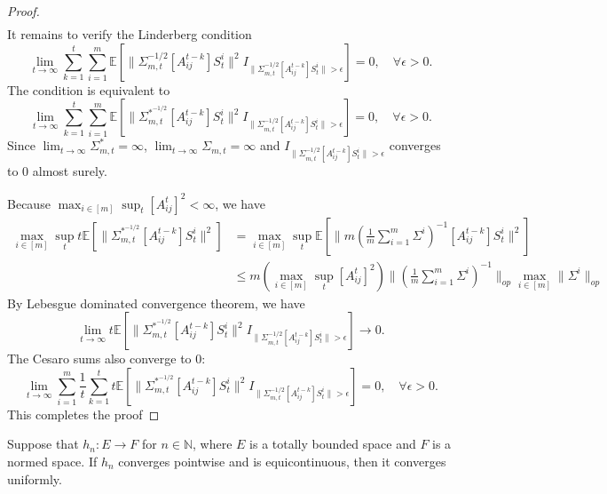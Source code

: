 \documentclass[twoside,11pt]{article}
\numberwithin{equation}{section}
\newcommand{\N}{{\mathbb{N}}}
\newcommand{\E}{\mathbb{E}}
\begin{document}
{\begin{proof}
\begin{align*}
    \end{align*}
It remains to verify the Linderberg condition
\begin{equation*}
    \lim_{t \to \infty}  \sum_{k = 1}^t \sum_{i = 1}^m \E\left[\|\Sigma_{m,t}^{-1/2} [A_{ij}^{t-k}] S_t^i \|^2 I_{\|\Sigma_{m,t}^{-1/2} [A_{ij}^{t-k}] S_t^i\| > \epsilon}\right]  = 0, \quad \forall \epsilon > 0. 
\end{equation*}
The condition is equivalent to 
\begin{equation*}
            \lim_{t \to \infty}  \sum_{k = 1}^t \sum_{i = 1}^m \E\left[\|\Sigma_{m,t}^{*^{-1/2}} [A_{ij}^{t-k}] S_t^i\|^2 I_{\|\Sigma_{m,t}^{-1/2} [A_{ij}^{t-k}] S_t^i\| > \epsilon}\right]  = 0, \quad \forall \epsilon > 0. 
\end{equation*}    
Since $\lim_{t \to \infty}\Sigma^*_{m,t} =  \infty$, $\lim_{t \to \infty}\Sigma_{m,t} = \infty$ and $ I_{\|\Sigma_{m,t}^{-1/2} [A_{ij}^{t-k}] S_t^i\| > \epsilon}$ converges to $0$ almost surely. 

Because $\max_{i \in [m]} \sup_t [A_{ij}^t]^2 < \infty$, we have
\begin{align*}
    \max_{i \in [m]}\sup_{t} t\E\left[ \|\Sigma_{m,t}^{*^{-1/2}} [A_{ij}^{t-k}] S_t^i\|^2\right] &= \max_{i \in [m]} \sup_{t} \E\left[\|m(\frac{1}{m}\sum_{i = 1}^m  \Sigma^i)^{-1} [A_{ij}^{t-k}] S_t^i\|^2\right]  \\
    &\leq m (\max_{i \in [m]} \sup_t [A_{ij}^t]^2 ) \|(\frac{1}{m}\sum_{i = 1}^m  \Sigma^i)^{-1}\|_{op} \max_{i \in [m]} \|\Sigma^i \|_{op}
\end{align*}
By Lebesgue dominated convergence theorem, we have
\begin{equation*}
    \lim_{t \to \infty} t\E\left[\|\Sigma_{m,t}^{*^{-1/2}} [A_{ij}^{t-k}] S_t^i\|^2 I_{\|\Sigma_{m,t}^{-1/2} [A_{ij}^{t-k}] S_t^i\| > \epsilon}\right]  \to 0. 
\end{equation*}
The Cesaro sums also converge to $0$: 
\begin{equation*}
    \lim_{t \to \infty} \sum_{i = 1}^m \frac{1}{t}\sum_{k = 1}^t t \E\left[\|\Sigma_{m,t}^{*^{-1/2}} [A_{ij}^{t-k}] S_t^i\|^2 I_{\|\Sigma_{m,t}^{-1/2} [A_{ij}^{t-k}] S_t^i\| > \epsilon}\right]  = 0, \quad \forall \epsilon > 0. 
\end{equation*}
This completes the proof
\end{proof}

\begin{lemma} 
\label{uniform-convergence-lemma}
Suppose that $h_n: E \to F$ for $n \in \N$, where $E$ is a totally bounded space and $F$ is a normed space. If $h_n$ converges pointwise and is equicontinuous, then it converges uniformly. 
\end{lemma}

}
\end{document}
